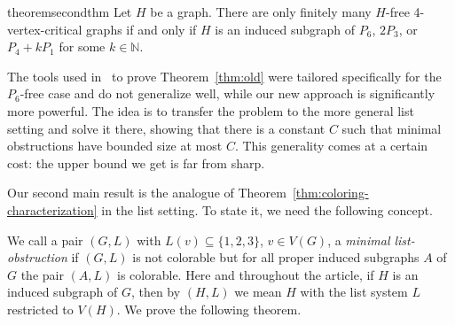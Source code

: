 \documentclass[11pt]{article}
\begin{document}
\begin{restatable}{theorem}{secondthm}
	\label{thm:coloring-characterization}%
Let $H$ be a graph.
There are only finitely many $H$-free 4-vertex-critical graphs if and only if $H$ is an induced subgraph of $P_6$, $2P_3$, or $P_4 + kP_1$ for some $k \in \mathbb N$.
\end{restatable}

The tools  used in~\cite{CGSZ15} to prove Theorem~\ref{thm:old} were tailored specifically for the $P_6$-free case and do not generalize well, while our new approach is significantly more powerful.
The idea is to transfer the problem to the more general list setting and solve it there, showing that there is a constant $C$ such that minimal obstructions 
have bounded size at most $C$.
This generality comes at a certain cost: the upper bound we get is far from 
sharp.


Our second main result is the analogue of Theorem~\ref{thm:coloring-characterization} in the list setting.
To state it, we need the following concept.

We call a pair $(G,L)$ with $L(v) \subseteq \{1,2,3\}$, $v \in V(G)$, a \emph{minimal list-obstruction} if $(G,L)$ is not colorable but for all proper induced 
subgraphs $A$ of $G$ the pair $\left(A,L\right)$ is colorable.
Here and throughout the article, if $H$ is an induced subgraph of $G$, then by
$(H,L)$ we mean $H$ with the list system $L$ restricted to $V(H)$.
We prove the following theorem.
\end{document}
